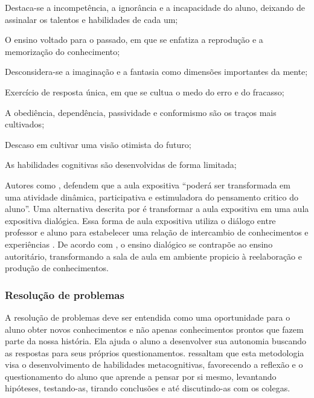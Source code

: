 \begin{alineascomponto}
\item Destaca-se a incompetência, a ignorância e a incapacidade do aluno, deixando de assinalar os talentos e habilidades de cada um; 
\item O ensino voltado para o passado, em que se enfatiza a reprodução e a memorização do conhecimento;
\item Desconsidera-se a imaginação e a fantasia como dimensões importantes da mente;
\item Exercício de resposta única, em que se cultua o medo do erro e do fracasso;
\item A obediência, dependência, passividade e conformismo são os traços mais cultivados;
\item Descaso em cultivar uma visão otimista do futuro;
\item As habilidades cognitivas são desenvolvidas de forma limitada;
\end{alineascomponto}

Autores como , defendem que a aula expositiva ``poderá ser transformada em uma atividade dinâmica, participativa e estimuladora do pensamento critico do aluno''. Uma alternativa descrita por  é transformar a aula expositiva em uma aula expositiva dialógica. Essa forma de aula expositiva utiliza o diálogo entre professor e aluno para estabelecer uma relação de intercambio de conhecimentos e experiências \cite{lopes1995aula}. De acordo com , o ensino dialógico se contrapõe ao ensino 
autoritário,  transformando  a  sala  de  aula  em  ambiente  propicio  à  reelaboração  e produção de conhecimentos.


\subsubsection{Resolução de problemas}\label{resolucao_problemas}

A resolução de problemas deve ser entendida como uma oportunidade para o aluno obter novos conhecimentos e não apenas conhecimentos prontos que fazem parte da nossa história. Ela ajuda o aluno a desenvolver sua autonomia buscando as respostas para seus próprios questionamentos.  ressaltam  que esta metodologia visa o desenvolvimento de habilidades metacognitivas, favorecendo a reflexão e o questionamento do aluno que aprende a pensar por si mesmo, levantando hipóteses, testando-as, tirando conclusões e até discutindo-as com os colegas.

